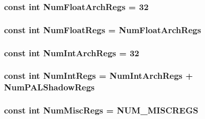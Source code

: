 \label{namespaceAlphaISA_a717317b863009b3e1b683c3bdddb9fd3}
\hypertarget{namespaceAlphaISA_a9ec947def3616ab9415089776195fa09}{
\subsubsection[{NumFloatArchRegs}]{\setlength{\rightskip}{0pt plus 5cm}const int {\bf NumFloatArchRegs} = 32}}
\label{namespaceAlphaISA_a9ec947def3616ab9415089776195fa09}
\hypertarget{namespaceAlphaISA_a627b25288f2452be107872a138df8b85}{
\subsubsection[{NumFloatRegs}]{\setlength{\rightskip}{0pt plus 5cm}const int {\bf NumFloatRegs} = {\bf NumFloatArchRegs}}}
\label{namespaceAlphaISA_a627b25288f2452be107872a138df8b85}
\hypertarget{namespaceAlphaISA_a405c0abe85dc0da846c120e3b31f375c}{
\subsubsection[{NumIntArchRegs}]{\setlength{\rightskip}{0pt plus 5cm}const int {\bf NumIntArchRegs} = 32}}
\label{namespaceAlphaISA_a405c0abe85dc0da846c120e3b31f375c}
\hypertarget{namespaceAlphaISA_a9c412b5118ce369570c156c4e156638a}{
\subsubsection[{NumIntRegs}]{\setlength{\rightskip}{0pt plus 5cm}const int {\bf NumIntRegs} = {\bf NumIntArchRegs} + {\bf NumPALShadowRegs}}}
\label{namespaceAlphaISA_a9c412b5118ce369570c156c4e156638a}
\hypertarget{namespaceAlphaISA_a568d4aa96dd7cd963f3b1b1b0446c9c6}{
\subsubsection[{NumMiscRegs}]{\setlength{\rightskip}{0pt plus 5cm}const int {\bf NumMiscRegs} = NUM\_\-MISCREGS}}
